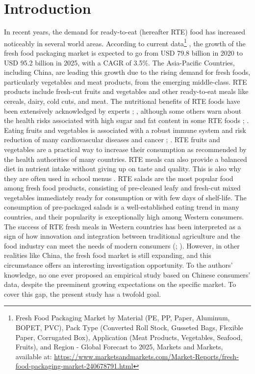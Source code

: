\documentclass[a4,12pt]{article}
\begin{document}
\section{Introduction}
\label{sec:1}

In recent years, the demand for ready-to-eat (hereafter RTE) food has increased noticeably in several world areas. According to current data\footnote{Fresh Food Packaging Market by Material (PE, PP, Paper, Aluminum, BOPET, PVC), Pack Type (Converted Roll Stock, Gusseted Bags, Flexible Paper, Corrugated Box), Application (Meat Products, Vegetables, Seafood, Fruits), and Region - Global Forecast to 2025, Markets and Markets, available at: \url{https://www.marketsandmarkets.com/Market-Reports/fresh-food-packaging-market-240678791.html}} , the growth of the fresh food packaging market is expected to go from USD 79.8 billion in 2020 to USD 95.2 billion in 2025, with a CAGR of 3.5\%. The Asia-Pacific Countries, including China, are leading this growth due to the rising demand for fresh foods, particularly vegetables and meat products, from the emerging middle-class.  RTE products include fresh-cut fruits and vegetables and other ready-to-eat meals like cereals, dairy, cold cuts, and meat. The nutritional benefits of RTE foods have been extensively acknowledged by experts \cite{Santeramo18}; \cite{Singla20}, although some others warn about the health risks associated with high sugar and fat content in some RTE foods \cite{Poti16}; \cite{Thike20}. Eating fruits and vegetables is associated with a robust immune system and risk reduction of many cardiovascular diseases and cancer \cite{Gibson12}; \cite{Gu21}. RTE fruits and vegetables are a practical way to increase their consumption as recommended by the health authorities of many countries. RTE meals can also provide a balanced diet in nutrient intake without giving up on taste and quality. This is also why they are often used in school menus \cite{Gibson19}. RTE salads are the most popular food among fresh food products, consisting of pre-cleaned leafy and fresh-cut mixed vegetables immediately ready for consumption or with few days of shelf-life. The consumption of pre-packaged salads is a well-established eating trend in many countries, and their popularity is exceptionally high among Western consumers.  The success of RTE fresh meals in Western countries has been interpreted as a sign of how innovation and integration between traditional agriculture and the food industry can meet the needs of modern consumers (\cite{Brennan13}; \cite{Massaglia19}). 
However, in other realities like China, the fresh food market is still expanding, and this circumstance offers an interesting investigation opportunity.  To the authors' knowledge, no one ever proposed an empirical study based on Chinese consumers' data, despite the preeminent growing expectations on the specific market. To cover this gap, the present study has a twofold goal. \\
\end{document}
